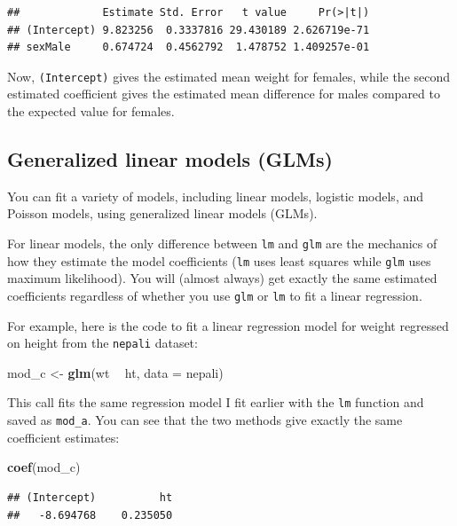 \documentclass[]{book}
\makeatletter
\newenvironment{Shaded}{\begin{snugshade}}{\end{snugshade}}
\newcommand{\KeywordTok}[1]{\textcolor[rgb]{0.13,0.29,0.53}{\textbf{#1}}}
\newcommand{\DataTypeTok}[1]{\textcolor[rgb]{0.13,0.29,0.53}{#1}}
\newcommand{\StringTok}[1]{\textcolor[rgb]{0.31,0.60,0.02}{#1}}
\newcommand{\OperatorTok}[1]{\textcolor[rgb]{0.81,0.36,0.00}{\textbf{#1}}}
\newcommand{\NormalTok}[1]{#1}
\newenvironment{kframe}{%
\medskip{}
\setlength{\fboxsep}{.8em}
 \def\at@end@of@kframe{}%
 \ifinner\ifhmode%
  \def\at@end@of@kframe{\end{minipage}}%
  \begin{minipage}{\columnwidth}%
 \fi\fi%
 \def\FrameCommand##1{\hskip\@totalleftmargin \hskip-\fboxsep
 \colorbox{shadecolor}{##1}\hskip-\fboxsep
     \hskip-\linewidth \hskip-\@totalleftmargin \hskip\columnwidth}%
 \MakeFramed {\advance\hsize-\width
   \@totalleftmargin\z@ \linewidth\hsize
   \@setminipage}}%
 {\par\unskip\endMakeFramed%
 \at@end@of@kframe}
\renewenvironment{Shaded}{\begin{kframe}}{\end{kframe}}
\theoremstyle{definition}
\theoremstyle{definition}
\theoremstyle{definition}
\theoremstyle{remark}
\makeatother
\begin{document}
\begin{verbatim}
##             Estimate Std. Error   t value     Pr(>|t|)
## (Intercept) 9.823256  0.3337816 29.430189 2.626719e-71
## sexMale     0.674724  0.4562792  1.478752 1.409257e-01
\end{verbatim}

Now, \texttt{(Intercept)} gives the estimated mean weight for females,
while the second estimated coefficient gives the estimated mean
difference for males compared to the expected value for females.

\subsection{Generalized linear models
(GLMs)}\label{generalized-linear-models-glms}

You can fit a variety of models, including linear models, logistic
models, and Poisson models, using generalized linear models (GLMs).
\medskip

For linear models, the only difference between \texttt{lm} and
\texttt{glm} are the mechanics of how they estimate the model
coefficients (\texttt{lm} uses least squares while \texttt{glm} uses
maximum likelihood). You will (almost always) get exactly the same
estimated coefficients regardless of whether you use \texttt{glm} or
\texttt{lm} to fit a linear regression.

For example, here is the code to fit a linear regression model for
weight regressed on height from the \texttt{nepali} dataset:

\begin{Shaded}
\begin{Highlighting}[]
\NormalTok{mod_c <-}\StringTok{ }\KeywordTok{glm}\NormalTok{(wt }\OperatorTok{~}\StringTok{ }\NormalTok{ht, }\DataTypeTok{data =}\NormalTok{ nepali)}
\end{Highlighting}
\end{Shaded}

This call fits the same regression model I fit earlier with the
\texttt{lm} function and saved as \texttt{mod\_a}. You can see that the
two methods give exactly the same coefficient estimates:

\begin{Shaded}
\begin{Highlighting}[]
\KeywordTok{coef}\NormalTok{(mod_c)}
\end{Highlighting}
\end{Shaded}

\begin{verbatim}
## (Intercept)          ht 
##   -8.694768    0.235050
\end{verbatim}
\end{document}
